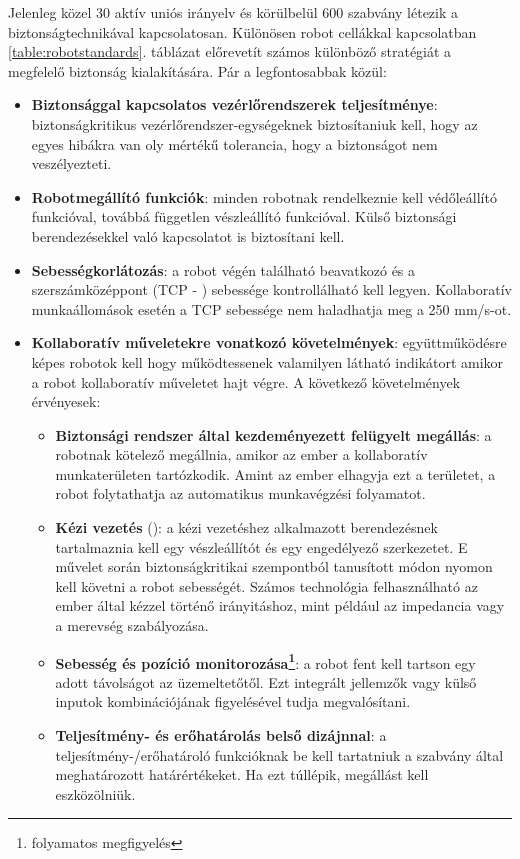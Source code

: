 \documentclass[../documentation.tex]{subfiles}
\begin{document}
Jelenleg közel 30 aktív uniós irányelv és körülbelül 600 szabvány létezik a biztonságtechnikával kapcsolatosan. Különösen robot cellákkal kapcsolatban \ref{table:robotstandards}. táblázat előrevetít számos különböző stratégiát a megfelelő biztonság kialakítására. Pár a legfontosabbak közül\cite{safehrc}:
\begin{itemize}
	\item \textbf{Biztonsággal kapcsolatos vezérlőrendszerek teljesítménye}: biztonságkritikus vezérlőrendszer-egységeknek biztosítaniuk kell, hogy az egyes hibákra van oly mértékű tolerancia, hogy a biztonságot nem veszélyezteti.
	\item \textbf{Robotmegállító funkciók}: minden robotnak rendelkeznie kell védőleállító funkcióval, továbbá független vészleállító funkcióval. Külső biztonsági berendezésekkel való kapcsolatot is biztosítani kell.
	\item \textbf{Sebességkorlátozás}: a robot végén található beavatkozó és a szerszámközéppont (TCP - ) sebessége kontrollálható kell legyen. Kollaboratív munkaállomások esetén a TCP sebessége nem haladhatja meg a 250 mm/s-ot.
	\item \textbf{Kollaboratív műveletekre vonatkozó követelmények}: együttműködésre képes robotok kell hogy működtessenek valamilyen látható indikátort amikor a robot kollaboratív műveletet hajt végre. A következő követelmények érvényesek:
	\begin{itemize}
		\item \textbf{Biztonsági rendszer által kezdeményezett felügyelt megállás}: a robotnak kötelező megállnia, amikor az ember a kollaboratív munkaterületen tartózkodik. Amint az ember elhagyja ezt a területet, a robot folytathatja az automatikus munkavégzési folyamatot.
		\item \textbf{Kézi vezetés} (): a kézi vezetéshez alkalmazott berendezésnek tartalmaznia kell egy vészleállítót és egy engedélyező szerkezetet. E művelet során biztonságkritikai szempontból tanusított módon nyomon kell követni a robot sebességét. Számos technológia felhasználható az ember által kézzel történő irányitáshoz, mint például az impedancia vagy a merevség szabályozása.
		\item \textbf{Sebesség és pozíció monitorozása\footnote{folyamatos megfigyelés}}: a robot fent kell tartson egy adott távolságot az üzemeltetőtől. Ezt integrált jellemzők vagy külső inputok kombinációjának figyelésével tudja megvalósítani.
		\item \textbf{Teljesítmény- és erőhatárolás belső dizájnnal}: a teljesítmény-/erőhatároló funkcióknak be kell tartatniuk a szabvány által meghatározott határértékeket. Ha ezt túllépik, megállást kell eszközölniük.

\end{itemize}
\end{itemize}
\end{document}
